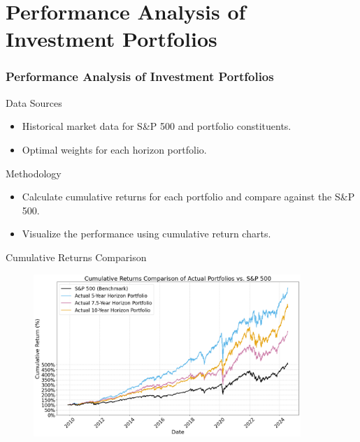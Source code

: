 \documentclass{beamer}
\begin{document}
\section{Performance Analysis of Investment Portfolios}
\begin{frame}
\frametitle{Performance Analysis of Investment Portfolios}
    \begin{block}{Data Sources}
        \begin{itemize}
            \item Historical market data for S\&P 500 and portfolio constituents.
            \item Optimal weights for each horizon portfolio.
        \end{itemize}
    \end{block}
    \begin{block}{Methodology}
        \begin{itemize}
            \item Calculate cumulative returns for each portfolio and compare against the S\&P 500.
            \item Visualize the performance using cumulative return charts.
        \end{itemize}
    \end{block}
\end{frame}


\begin{frame}{Cumulative Returns Comparison}
    \begin{figure}
        \centering
        \includegraphics[width=0.9\textwidth]{../Figures/cumulative_returns_comparison.png}
    \end{figure}
\end{frame}
\end{document}
